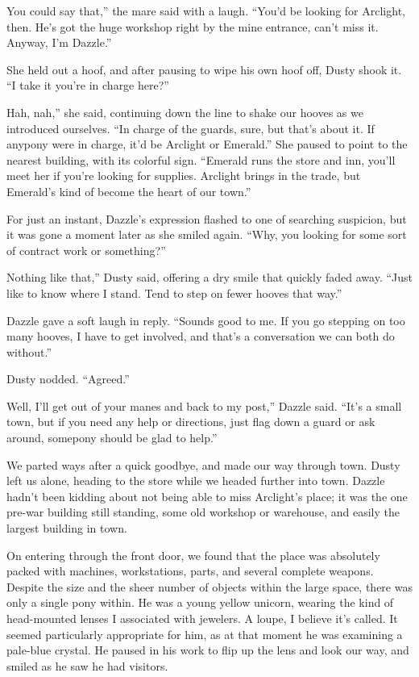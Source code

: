 \leavevmode{}You could say that,” the mare said with a laugh. “You’d be looking for Arclight, then. He’s got the huge workshop right by the mine entrance, can’t miss it. Anyway, I’m Dazzle.”

She held out a hoof, and after pausing to wipe his own hoof off, Dusty shook it. “I take it you’re in charge here?”

\leavevmode{}Hah, nah,” she said, continuing down the line to shake our hooves as we introduced ourselves. “In charge of the guards, sure, but that’s about it. If anypony were in charge, it’d be Arclight or Emerald.” She paused to point to the nearest building, with its colorful sign. “Emerald runs the store and inn, you’ll meet her if you’re looking for supplies. Arclight brings in the trade, but Emerald’s kind of become the heart of our town.”

For just an instant, Dazzle’s expression flashed to one of searching suspicion, but it was gone a moment later as she smiled again. “Why, you looking for some sort of contract work or something?”

\leavevmode{}Nothing like that,” Dusty said, offering a dry smile that quickly faded away. “Just like to know where I stand. Tend to step on fewer hooves that way.”

Dazzle gave a soft laugh in reply. “Sounds good to me. If you go stepping on too many hooves, I have to get involved, and that’s a conversation we can both do without.”

Dusty nodded. “Agreed.”

\leavevmode{}Well, I’ll get out of your manes and back to my post,” Dazzle said. “It’s a small town, but if you need any help or directions, just flag down a guard or ask around, somepony should be glad to help.”

We parted ways after a quick goodbye, and made our way through town. Dusty left us alone, heading to the store while we headed further into town. Dazzle hadn’t been kidding about not being able to miss Arclight’s place; it was the one pre-war building still standing, some old workshop or warehouse, and easily the largest building in town.

On entering through the front door, we found that the place was absolutely packed with machines, workstations, parts, and several complete weapons. Despite the size and the sheer number of objects within the large space, there was only a single pony within. He was a young yellow unicorn, wearing the kind of head-mounted lenses I associated with jewelers. A loupe, I believe it’s called. It seemed particularly appropriate for him, as at that moment he was examining a pale-blue crystal. He paused in his work to flip up the lens and look our way, and smiled as he saw he had visitors.

